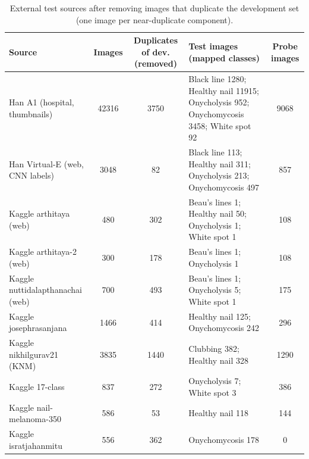 \begin{table}[!tbp]
\centering
\caption{External test sources after removing images that duplicate the development set (one image per near-duplicate component).}
\label{tab:extsources}
\footnotesize
\begin{tabular}{lcclc}
\hline
Source & Images & Duplicates of dev. (removed) & Test images (mapped classes) & Probe images \\
\hline
Han A1 (hospital, thumbnails) & 42316 & 3750 & Black line 1280; Healthy nail 11915; Onycholysis 952; Onychomycosis 3458; White spot 92 & 9068 \\
Han Virtual-E (web, CNN labels) & 3048 & 82 & Black line 113; Healthy nail 311; Onycholysis 213; Onychomycosis 497 & 857 \\
Kaggle arthitaya (web) & 480 & 302 & Beau's lines 1; Healthy nail 50; Onycholysis 1; White spot 1 & 108 \\
Kaggle arthitaya-2 (web) & 300 & 178 & Beau's lines 1; Onycholysis 1 & 108 \\
Kaggle nuttidalapthanachai (web) & 700 & 493 & Beau's lines 1; Onycholysis 5; White spot 1 & 175 \\
Kaggle josephrasanjana & 1466 & 414 & Healthy nail 125; Onychomycosis 242 & 296 \\
Kaggle nikhilgurav21 (KNM) & 3835 & 1440 & Clubbing 382; Healthy nail 328 & 1290 \\
Kaggle 17-class & 837 & 272 & Onycholysis 7; White spot 3 & 386 \\
Kaggle nail-melanoma-350 & 586 & 53 & Healthy nail 118 & 144 \\
Kaggle isratjahanmitu & 556 & 362 & Onychomycosis 178 & 0 \\
\hline
\end{tabular}
\end{table}